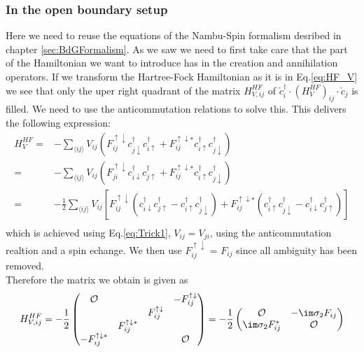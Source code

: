 \documentclass[../main.tex]{subfile}
\begin{document}
\subsubsection{In the open boundary setup}
Here we need to reuse the equations of the Nambu-Spin formalism desribed in chapter \ref{sec:BdGFormalism}. As we saw we need to first
take care that the part of the Hamiltonian we want to introduce has  in the creation and annihilation operators.
If we transform the Hartree-Fock Hamiltonian as it is in Eq.\ref{eq:HF_V} we see that only the uper right quadrant of the matrix $H_{V,ij}^{HF}$ 
of $\check{c}_i^{\dagger} \cdot (H_{V}^{HF})_{ij}\cdot \check{c}_j $ is filled. We need to use the anticommutation relations to solve this.
This delivers the following expression:
\begin{equation}
    \begin{aligned}
    H_V^{HF} =& -\sum_{\langle ij\rangle} V_{ij} \left(F_{ij}^{\uparrow \downarrow} c_{j\downarrow}^{\dagger}c_{i\uparrow}^{\dagger} +
     F_{ij}^{\uparrow \downarrow\ast} c_{i\uparrow}^{\dagger}c_{j\downarrow}^{\dagger}\right)\\
     =& -\sum_{\langle ij\rangle} V_{ij} \left(F_{ji}^{\uparrow \downarrow} c_{i\downarrow}^{\dagger}c_{j\uparrow}^{\dagger} +
     F_{ij}^{\uparrow \downarrow\ast} c_{i\uparrow}^{\dagger}c_{j\downarrow}^{\dagger}\right)\\
     =& -\frac{1}{2}\sum_{\langle ij\rangle} V_{ij} \left[F_{ij}^{\uparrow \downarrow} \left(c_{i\downarrow}^{\dagger}c_{j\uparrow}^{\dagger} - c_{i\uparrow}^{\dagger}c_{j\downarrow}^{\dagger}\right)
     + F_{ij}^{\uparrow \downarrow\ast}  \left(c_{i\uparrow}^{\dagger}c_{j\downarrow}^{\dagger} - c_{i\downarrow}^{\dagger}c_{j\uparrow}^{\dagger}\right)\right]\\
    \end{aligned}
\end{equation} 
which is achieved using Eq.\ref{eq:Trick1}, $V_{ij} = {V_{ji}}$, 
using the anticommutation realtion and a spin echange. We then use $F_{ij}^{\uparrow \downarrow}$ = $F_{ij}$ since all ambiguity has been removed.\\
Therefore the matrix we obtain is given as
\begin{equation}
    H_{V,ij}^{HF} = -\frac{1}{2}\begin{pmatrix}
        \mathcal{O} & & & -F_{ij}^{\uparrow \downarrow}\\
         & & F_{ij}^{\uparrow \downarrow} & \\
         & F_{ij}^{\uparrow \downarrow\ast}& & \\
         -F_{ij}^{\uparrow \downarrow\ast} & & & \mathcal{O}\\
    \end{pmatrix} = -\frac{1}{2}\begin{pmatrix}
        \mathcal{O} & -\im \sigma_2 F_{ij}\\
        \im \sigma_2 F_{ij}^{\ast} & \mathcal{O}
    \end{pmatrix}
\end{equation}
\end{document}
